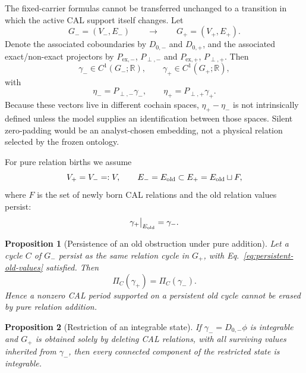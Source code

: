 \documentclass[aip,jmp,amsmath,amssymb,reprint]{revtex4-2}
\newtheorem{proposition}{Proposition}
\begin{document}
The fixed-carrier formulas cannot be transferred unchanged to a transition in which the active CAL support itself changes. Let
\begin{equation}
G_-=(V_-,E_-)
\qquad\longrightarrow\qquad
G_+=(V_+,E_+).
\end{equation}
Denote the associated coboundaries by $D_{0,-}$ and $D_{0,+}$, and the associated exact/non-exact projectors by $P_{\mathrm{ex},-}$, $P_{\perp,-}$ and $P_{\mathrm{ex},+}$, $P_{\perp,+}$. Then
\begin{equation}
\gamma_-\in C^1(G_-;\mathbb R),
\qquad
\gamma_+\in C^1(G_+;\mathbb R),
\end{equation}
with
\begin{equation}
\eta_-=P_{\perp,-}\gamma_- ,
\qquad
\eta_+=P_{\perp,+}\gamma_+ .
\end{equation}
Because these vectors live in different cochain spaces, $\eta_+-\eta_-$ is not intrinsically defined unless the model supplies an identification between those spaces. Silent zero-padding would be an analyst-chosen embedding, not a physical relation selected by the frozen ontology.

For pure relation births we assume
\begin{equation}
V_+=V_-=:V,
\qquad
E_-=E_{\rm old}\subset E_+=E_{\rm old}\sqcup F,
\label{eq:pure-addition-support}
\end{equation}
where $F$ is the set of newly born CAL relations and the old relation values persist:
\begin{equation}
\gamma_+\big|_{E_{\rm old}}=\gamma_-.
\label{eq:persistent-old-values}
\end{equation}

\begin{proposition}[Persistence of an old obstruction under pure addition]\label{prop:persistent-obstruction}
Let a cycle $C$ of $G_-$ persist as the same relation cycle in $G_+$, with Eq.~\eqref{eq:persistent-old-values} satisfied. Then
\begin{equation}
\Pi_C(\gamma_+)=\Pi_C(\gamma_-).
\end{equation}
Hence a nonzero CAL period supported on a persistent old cycle cannot be erased by pure relation addition.
\end{proposition}

\begin{proposition}[Restriction of an integrable state]\label{prop:deletion-integrability}
If $\gamma_-=D_{0,-}\phi$ is integrable and $G_+$ is obtained solely by deleting CAL relations, with all surviving values inherited from $\gamma_-$, then every connected component of the restricted state is integrable.
\end{proposition}
\end{document}
